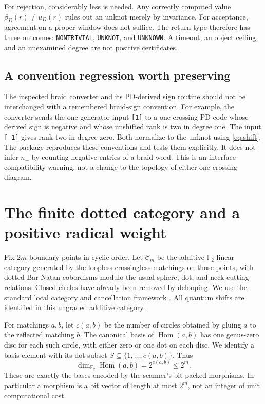 \documentclass[11pt]{article}
\theoremstyle{definition}\newtheorem{definition}[theorem]{Definition}
\theoremstyle{remark}\newtheorem{remark}[theorem]{Remark}
\newcommand{\F}{\mathbb F_2}
\newcommand{\Hom}{\operatorname{Hom}}
\begin{document}
For rejection, considerably less is needed. Any correctly computed value $\beta_D(r)\ne u_D(r)$ rules out an unknot merely by invariance. For acceptance, agreement on a proper window does not suffice. The return type therefore has three outcomes: \texttt{NONTRIVIAL}, \texttt{UNKNOT}, and \texttt{UNKNOWN}. A timeout, an object ceiling, and an unexamined degree are not positive certificates.

\subsection{A convention regression worth preserving}
The inspected braid converter and its PD-derived sign routine should not be interchanged with a remembered braid-sign convention. For example, the converter sends the one-generator input \texttt{[1]} to a one-crossing PD code whose derived sign is negative and whose unshifted rank is two in degree one. The input \texttt{[-1]} gives rank two in degree zero. Both normalize to the unknot using \eqref{eq:shift}. The package reproduces these conventions and tests them explicitly. It does not infer $n_-$ by counting negative entries of a braid word. This is an interface compatibility warning, not a change to the topology of either one-crossing diagram.

\section{The finite dotted category and a positive radical weight}
\label{sec:radical}
Fix $2m$ boundary points in cyclic order. Let $\mathcal C_m$ be the additive $\F$-linear category generated by the loopless crossingless matchings on those points, with dotted Bar-Natan cobordisms modulo the usual sphere, dot, and neck-cutting relations. Closed circles have already been removed by delooping. We use the standard local category and cancellation framework \cite{BN}. All quantum shifts are identified in this ungraded additive category.

For matchings $a,b$, let $c(a,b)$ be the number of circles obtained by gluing $a$ to the reflected matching $b$. The canonical basis of $\Hom(a,b)$ has one genus-zero disc for each such circle, with either zero or one dot on each disc. We identify a basis element with its dot subset $S\subseteq\{1,\ldots,c(a,b)\}$. Thus
\begin{equation}
 \dim_{\F}\Hom(a,b)=2^{c(a,b)}\leq 2^m.\label{eq:homdimension}
\end{equation}
These are exactly the bases encoded by the scanner's bit-packed morphisms. In particular a morphism is a bit vector of length at most $2^m$, not an integer of unit computational cost.
\end{document}
